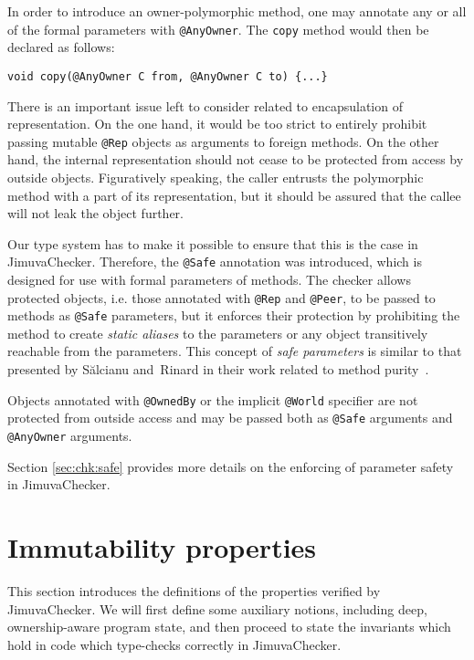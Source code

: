 \documentclass{pracamgr}
\theoremstyle{break}
\theoremstyle{break}
\theoremstyle{break}
\begin{document}
In order to introduce an owner-polymorphic method, one may annotate
any or all of the formal parameters with \texttt{@AnyOwner}. The
\texttt{copy} method would then be declared as follows:
\begin{lstlisting}
void copy(@AnyOwner C from, @AnyOwner C to) {...}
\end{lstlisting}

There is an important issue left to consider related to encapsulation
of representation. On the one hand, it would be too strict to entirely
prohibit passing mutable \texttt{@Rep} objects as arguments to foreign
methods. On the other hand, the internal representation should not
cease to be protected from access by outside objects. Figuratively
speaking, the caller entrusts the polymorphic method with a part of
its representation, but it should be assured that the callee will not
leak the object further.

Our type system has to make it possible to ensure that this is the
case in JimuvaChecker. Therefore, the \texttt{@Safe} annotation was
introduced, which is designed for use with formal parameters of
methods. The checker allows protected objects, i.e. those annotated
with \texttt{@Rep} and \texttt{@Peer}, to be passed to methods as
\texttt{@Safe} parameters, but it enforces their protection by
prohibiting the method to create \emph{static aliases} to the
parameters or any object transitively reachable from the
parameters. This concept of \emph{safe parameters} is similar to that
presented by Sălcianu and~Rinard in their work related to method
purity~\cite{purity}.

Objects annotated with \texttt{@OwnedBy} or the implicit
\texttt{@World} specifier are not protected from outside access and
may be passed both as \texttt{@Safe} arguments and \texttt{@AnyOwner}
arguments. 

Section \ref{sec:chk:safe} provides more details on the
enforcing of parameter safety in JimuvaChecker.

\section{Immutability properties}
\label{sec:properties}

This section introduces the definitions of the properties verified by
JimuvaChecker. We will first define some auxiliary notions, including
deep, ownership-aware program state, and then proceed to state the
invariants which hold in code which type-checks correctly in
JimuvaChecker.
\end{document}
